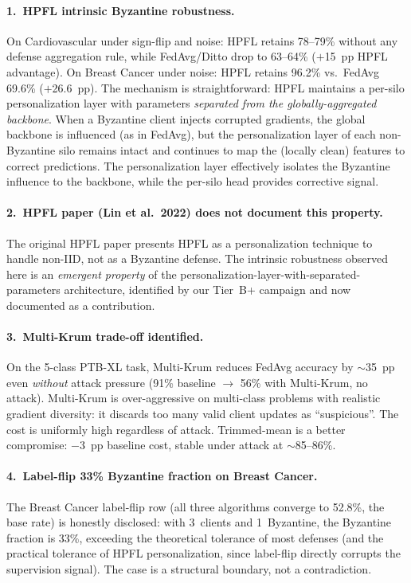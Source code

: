 \documentclass[conference]{IEEEtran}
\begin{document}
\paragraph{1.\ HPFL intrinsic Byzantine robustness.} On Cardiovascular under sign-flip and noise: HPFL retains 78--79\% without any defense aggregation rule, while FedAvg/Ditto drop to 63--64\% ($+$15~pp HPFL advantage). On Breast Cancer under noise: HPFL retains 96.2\% vs.\ FedAvg 69.6\% ($+$26.6~pp). The mechanism is straightforward: HPFL maintains a per-silo personalization layer with parameters \emph{separated from the globally-aggregated backbone}. When a Byzantine client injects corrupted gradients, the global backbone is influenced (as in FedAvg), but the personalization layer of each non-Byzantine silo remains intact and continues to map the (locally clean) features to correct predictions. The personalization layer effectively isolates the Byzantine influence to the backbone, while the per-silo head provides corrective signal.

\paragraph{2.\ HPFL paper (Lin et al.~2022) does not document this property.} The original HPFL paper presents HPFL as a personalization technique to handle non-IID, not as a Byzantine defense. The intrinsic robustness observed here is an \emph{emergent property} of the personalization-layer-with-separated-parameters architecture, identified by our Tier~B+ campaign and now documented as a contribution.

\paragraph{3.\ Multi-Krum trade-off identified.} On the 5-class PTB-XL task, Multi-Krum reduces FedAvg accuracy by $\sim$35~pp even \emph{without} attack pressure (91\% baseline $\to$ 56\% with Multi-Krum, no attack). Multi-Krum is over-aggressive on multi-class problems with realistic gradient diversity: it discards too many valid client updates as ``suspicious''. The cost is uniformly high regardless of attack. Trimmed-mean is a better compromise: $-$3~pp baseline cost, stable under attack at $\sim$85--86\%.

\paragraph{4.\ Label-flip 33\% Byzantine fraction on Breast Cancer.} The Breast Cancer label-flip row (all three algorithms converge to 52.8\%, the base rate) is honestly disclosed: with 3~clients and 1~Byzantine, the Byzantine fraction is 33\%, exceeding the theoretical tolerance of most defenses (and the practical tolerance of HPFL personalization, since label-flip directly corrupts the supervision signal). The case is a structural boundary, not a contradiction.
\end{document}
